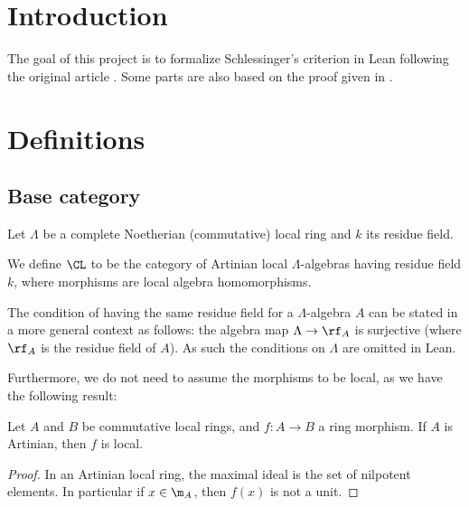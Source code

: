 
\chapter{Introduction}
The goal of this project is to formalize Schlessinger's criterion in Lean following
the original article \cite{Sch}. Some parts are also based on the proof given in
\cite[\href{https://stacks.math.columbia.edu/tag/06G7}{Tag 06G7}]{stacks-project}.


\chapter{Definitions}
\label{sec:defs}

\section{Base category}

Let $\Lambda$ be a complete Noetherian (commutative) local ring and $k$ its
residue field.

\begin{definition}
  \label{def:ArtinResAlg}
  \leanok
  We define $\CL$ to be the category of Artinian local $\Lambda$-algebras
  having residue field $k$, where morphisms are local algebra homomorphisms.
\end{definition}

The condition of having the same residue field for a $\Lambda$-algebra $A$ can
be stated
in a more general context as follows: the algebra map $\Lambda \to \rf_A$
is surjective (where $\rf_A$ is the residue field of $A$).
As such the conditions on $\Lambda$ are omitted in Lean.

Furthermore, we do not need to assume the morphisms to be local, as we have the
following result:

\begin{lemma}
  \label{lem:islocalhom_of_artinian}
  \leanok
  Let $A$ and $B$ be commutative local rings, and $f : A \to B$ a ring morphism.
  If $A$ is Artinian, then $f$ is local.
\end{lemma}

\begin{proof}
  \leanok
  In an Artinian local ring, the maximal ideal is the set of
  nilpotent elements. In particular if $x \in \m_A$, then $f (x)$
  is not a unit.
\end{proof}

